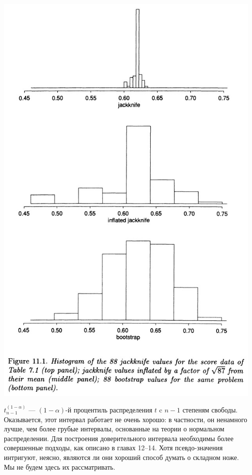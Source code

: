 \noindent
\includegraphics[width=\linewidth]{11/f11.1.jpg}
\newline

 $t_{n-1}^{(1-\alpha)}$ --- $(1-\alpha)$-й процентиль распределения $t$ c $n-1$ степеням свободы. Оказывается, этот интервал работает не очень хорошо: в частности, он ненамного лучше, чем более грубые интервалы, основанные на теории о нормальном распределении. Для построения доверительного интервала необходимы более совершенные подходы, как описано в главах 12–14. Хотя псевдо-значения интригуют, неясно, являются ли они хороший способ думать о складном ноже. Мы не будем здесь их рассматривать.